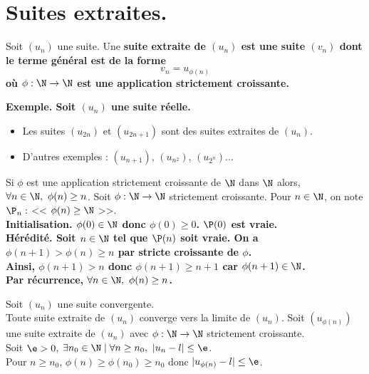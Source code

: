 \documentclass[11pt]{article}
\begin{document}
\pagebreak

\section{Suites extraites.}

\begin{defi}{}{}
    Soit $(u_n)$ une suite. Une \bf{suite extraite} de $(u_n)$ est une suite $(v_n)$ dont le terme général est de la forme
    \begin{equation*}
        v_n = u_{\phi(n)}
    \end{equation*}
    où $\phi:\N\to\N$ est une application strictement croissante.
\end{defi}

\bf{Exemple.} Soit $(u_n)$ une suite réelle.
\begin{itemize}
    \item Les suites $(u_{2n})$ et $(u_{2n+1})$ sont des suites extraites de $(u_n)$.
    \item D'autres exemples : $(u_{n+1})$, $(u_{n^2})$, $(u_{2^n})$...
\end{itemize}

\begin{lemme}{}{}
    Si $\phi$ est une application strictement croissante de $\N$ dans $\N$ alors, $\forall n \in \N, ~ \phi(n) \geq n$.
    \tcblower
    Soit $\phi:\N\to\N$ strictement croissante. Pour $n\in\N$, on note $\P_n:$ << $\phi(n)\geq\N$ >>.\\
    \bf{Initialisation.} $\phi(0)\in\N$ donc $\phi(0)\geq0$. $\P(0)$ est vraie.\\
    \bf{Hérédité.} Soit $n\in\N$ tel que $\P(n)$ soit vraie. On a $\phi(n+1)>\phi(n)\geq n$ par stricte croissante de $\phi$.\\
    Ainsi, $\phi(n+1)>n$ donc $\phi(n+1)\geq n+1$ car $\phi(n+1)\in\N$.\\
    Par récurrence, $\forall n \in \N, ~ \phi(n) \geq n$.
\end{lemme}

\begin{prop}{}{}
    Soit $(u_n)$ une suite convergente.\\
    Toute suite extraite de $(u_n)$ converge vers la limite de $(u_n)$.
    \tcblower
    Soit $(u_{\phi(n)})$ une suite extraite de $(u_n)$ avec $\phi:\N\to\N$ strictement croissante.\\
    Soit $\e>0$, $\exists n_0 \in \N \mid \forall n \geq n_0, ~ |u_n - l| \leq \e$.\\
    Pour $n\geq n_0$, $\phi(n)\geq\phi(n_0)\geq n_0$ donc $|u_{\phi(n)} - l| \leq \e$.
\end{prop}
\end{document}
